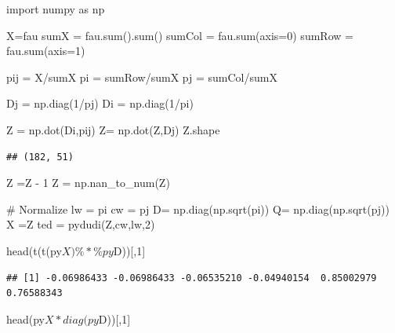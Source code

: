 \documentclass[
  10pt,
]{article}
\newenvironment{Shaded}{\begin{snugshade}}{\end{snugshade}}
\newcommand{\NormalTok}[1]{#1}
\begin{document}
\begin{Shaded}
\begin{Highlighting}[]
\NormalTok{import numpy as np}

\NormalTok{X=fau}
\NormalTok{sumX = fau.sum().sum()}
\NormalTok{sumCol =  fau.sum(axis=0)}
\NormalTok{sumRow = fau.sum(axis=1)}

\NormalTok{pij = X/sumX}
\NormalTok{pi = sumRow/sumX}
\NormalTok{pj = sumCol/sumX}

\NormalTok{Dj = np.diag(1/pj)}
\NormalTok{Di = np.diag(1/pi)}

\NormalTok{Z = np.dot(Di,pij)}
\NormalTok{Z= np.dot(Z,Dj)}
\NormalTok{Z.shape}
\end{Highlighting}
\end{Shaded}

\begin{verbatim}
## (182, 51)
\end{verbatim}

\begin{Shaded}
\begin{Highlighting}[]
\NormalTok{Z =Z {-} 1}
\NormalTok{Z = np.nan\_to\_num(Z)}

\NormalTok{\# Normalize}
\NormalTok{lw = pi}
\NormalTok{cw = pj}
\NormalTok{D= np.diag(np.sqrt(pi))}
\NormalTok{Q= np.diag(np.sqrt(pj))}
\NormalTok{X =Z}
\NormalTok{ted = pydudi(Z,cw,lw,2)}
\end{Highlighting}
\end{Shaded}

\begin{Shaded}
\end{Shaded}

\begin{Shaded}
\begin{Highlighting}[]
\NormalTok{head(t(t(py$X)\%*\%py$D))[,1]}
\end{Highlighting}
\end{Shaded}

\begin{verbatim}
## [1] -0.06986433 -0.06986433 -0.06535210 -0.04940154  0.85002979  0.76588343
\end{verbatim}

\begin{Shaded}
\begin{Highlighting}[]
\NormalTok{head(py$X*diag(py$D))[,1]}
\end{Highlighting}
\end{Shaded}
\end{document}
